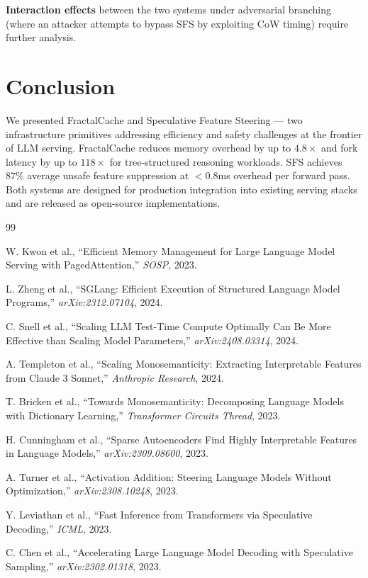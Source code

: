 \documentclass[10pt,twocolumn]{article}
\begin{document}
\textbf{Interaction effects} between the two systems under adversarial branching (where an attacker attempts to bypass SFS by exploiting CoW timing) require further analysis.

\section{Conclusion}

We presented FractalCache and Speculative Feature Steering — two infrastructure primitives addressing efficiency and safety challenges at the frontier of LLM serving. FractalCache reduces memory overhead by up to $4.8\times$ and fork latency by up to $118\times$ for tree-structured reasoning workloads. SFS achieves $87\%$ average unsafe feature suppression at $<0.8$ms overhead per forward pass. Both systems are designed for production integration into existing serving stacks and are released as open-source implementations.


\begin{thebibliography}{99}

W. Kwon et al., ``Efficient Memory Management for Large Language Model Serving with PagedAttention,'' \textit{SOSP}, 2023.

L. Zheng et al., ``SGLang: Efficient Execution of Structured Language Model Programs,'' \textit{arXiv:2312.07104}, 2024.

C. Snell et al., ``Scaling LLM Test-Time Compute Optimally Can Be More Effective than Scaling Model Parameters,'' \textit{arXiv:2408.03314}, 2024.

A. Templeton et al., ``Scaling Monosemanticity: Extracting Interpretable Features from Claude 3 Sonnet,'' \textit{Anthropic Research}, 2024.

T. Bricken et al., ``Towards Monosemanticity: Decomposing Language Models with Dictionary Learning,'' \textit{Transformer Circuits Thread}, 2023.

H. Cunningham et al., ``Sparse Autoencoders Find Highly Interpretable Features in Language Models,'' \textit{arXiv:2309.08600}, 2023.

A. Turner et al., ``Activation Addition: Steering Language Models Without Optimization,'' \textit{arXiv:2308.10248}, 2023.

Y. Leviathan et al., ``Fast Inference from Transformers via Speculative Decoding,'' \textit{ICML}, 2023.

C. Chen et al., ``Accelerating Large Language Model Decoding with Speculative Sampling,'' \textit{arXiv:2302.01318}, 2023.

\end{thebibliography}
\end{document}
